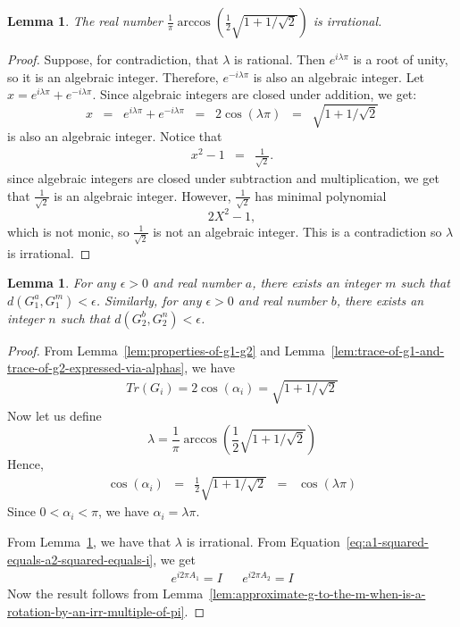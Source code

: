\documentclass[11pt]{article}
\def\({\begin{eqnarray*}}
\def\){\end{eqnarray*}}
\newtheorem{lemma}[theorem]{Lemma}
\begin{document}
\begin{lemma}
\label{lem:a-specific-lambda-is-irrational}
The real number $\frac{1}{\pi}
\arccos\!\left(
\frac{1}{2}
\sqrt{1 + 1/\sqrt{2}}
\right)$
is irrational.
\end{lemma}

\begin{proof}
Suppose, for contradiction, that $\lambda$ is rational.
Then $e^{i\lambda\pi}$ is a root of unity, so it is an algebraic integer.
Therefore,
$e^{-i\lambda\pi}$ is also an algebraic integer.
Let $x = e^{i\lambda\pi} + e^{-i\lambda\pi}$.
Since algebraic integers are closed under addition, we get:
\[
x 
\;\;=\;\;
e^{i\lambda\pi}+e^{-i\lambda\pi}
\;\;=\;\;
2\cos(\lambda\pi)
\;\;=\;\;
\sqrt{1+1/\sqrt{2}}
\]
is also an algebraic integer.
Notice that
\(
x^2-1 &=& \frac{1}{\sqrt{2}}.
\)
since algebraic integers are closed under subtraction and multiplication, we get
that $\frac{1}{\sqrt{2}}$ is an algebraic integer.
However, $\frac{1}{\sqrt{2}}$ has minimal polynomial
\[
2X^2-1,
\]
which is not monic, so $\frac{1}{\sqrt{2}}$ is not an algebraic integer.
This is a contradiction so $\lambda$ is irrational.
\end{proof}

\newpage

\begin{lemma}
\label{lem:approximate-g1-a-g2-b}
For any $\epsilon > 0$ and real number $a$,
there exists an integer $m$ such that 
$d(G_1^a, G_1^m) < \epsilon$.
Similarly, for any $\epsilon > 0$ and real number $b$,
there exists an integer $n$ such that 
$d(G_2^b, G_2^n) < \epsilon$.
\end{lemma}

\begin{proof}%
From 
Lemma~\ref{lem:properties-of-g1-g2} and
Lemma~\ref{lem:trace-of-g1-and-trace-of-g2-expressed-via-alphas},
we have
\(
Tr(G_i) 
= 2 \cos(\alpha_i) 
= \sqrt{1 + 1/\sqrt{2}}
\)
Now let us define 
\[
\lambda
=
\frac{1}{\pi}
\arccos\!\left(
\frac{1}{2}
\sqrt{1 + 1/\sqrt{2}}
\right)
\]
Hence, 
\(
\cos(\alpha_i) &=&
\frac{1}{2} \sqrt{1 + 1/\sqrt{2}} 
\;\;=\;\; \cos(\lambda \pi)
\)
Since $0 < \alpha_i < \pi$, 
we have
$\alpha_i=\lambda\pi$.

From Lemma~\ref{lem:a-specific-lambda-is-irrational}, 
we have that $\lambda$ is irrational.
From Equation~\ref{eq:a1-squared-equals-a2-squared-equals-i}, 
we get
\(
e^{i 2 \pi A_1} = I 
&&
e^{i 2 \pi A_2} = I
\)
Now the result follows from 
Lemma~\ref{lem:approximate-g-to-the-m-when-is-a-rotation-by-an-irr-multiple-of-pi}.
\end{proof}
\end{document}
